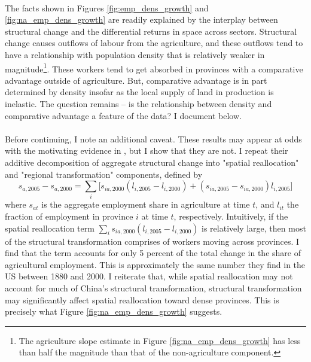 \documentclass[]{article}
\theoremstyle{plain}
\begin{document}
\paragraph*{}
The facts shown in Figures \ref{fig:emp_dens_growth} and \ref{fig:na_emp_dens_growth} are readily explained by the interplay between structural change and the differential returns in space across sectors. Structural change causes outflows of labour from the agriculture, and these outflows tend to have a relationship with population density that is relatively weaker in magnitude\footnote{The agriculture slope estimate in Figure \ref{fig:na_emp_dens_growth} has less than half the magnitude than that of the non-agriculture component.}. These workers tend to get absorbed in provinces with a comparative advantage outside of agriculture. But, comparative advantage is in part determined by density insofar as the local supply of land in production is inelastic. The question remains -- is the relationship between density and comparative advantage a feature of the data? I document below. 
\paragraph*{}
Before continuing, I note an additional caveat. These results may appear at odds with the motivating evidence in \cite{eckertpeters}, but I show that they are not. I repeat their additive decomposition of aggregate structural change into "spatial reallocation" and "regional transformation" components, defined by
\begin{equation}
	s_{a, 2005} - s_{a, 2000} = \sum_{i}\big[s_{ia, 2000}(l_{i, 2005} - l_{i, 2000}) + (s_{ia, 2005} - s_{ia, 2000})l_{i, 2005}\bigg]
\end{equation}
where $s_{at}$ is the aggregate employment share in agriculture at time $t$, and $l_{it}$ the fraction of employment in province $i$ at time $t$, respectively. Intuitively, if the spatial reallocation term $\sum_{i}s_{ia, 2000}(l_{i, 2005} - l_{i, 2000})$ is relatively large, then most of the structural transformation comprises of workers moving across provinces. I find that the term  accounts for only 5 percent of the total change in the share of agricultural employment. This is approximately the same number they find in the US between 1880 and 2000. I reiterate that, while spatial reallocation may not account for much of China's structural transformation, structural transformation may significantly affect spatial reallocation toward dense provinces. This is precisely what Figure \ref{fig:na_emp_dens_growth} suggests.
\end{document}
